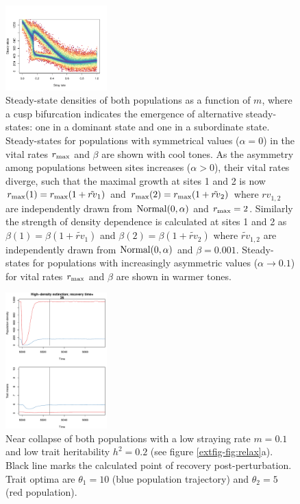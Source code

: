 \documentclass{revtex4}
\begin{document}
\begin{figure}
  \captionsetup{justification=raggedright,
singlelinecheck=false
}
\centering
\includegraphics[width=0.35\textwidth]{fig_asymdensity.pdf}
\caption{
Steady-state densities of both populations as a function of $m$, where a cusp bifurcation indicates the emergence of alternative steady-states: one in a dominant state and one in a subordinate state.
Steady-states for populations with symmetrical values ($\alpha=0$) in the vital rates $r_{\rm max}$ and $\beta$ are shown with cool tones.
As the asymmetry among populations between sites increases ($\alpha>0$), their vital rates diverge, such that the maximal growth at sites 1 and 2 is now $r_{\rm max}(1)=r_{\rm max}(1+\tilde{rv}_1)$ and $r_{\rm max}(2)=r_{\rm max}(1+\tilde{rv}_2)$ where $rv_{1,2}$ are independently drawn from $\rm{Normal}(0,\alpha)$ and $r_{\rm max}=2$. 
Similarly the strength of density dependence is calculated at sites 1 and 2 as $\beta(1)=\beta(1+\tilde{rv}_1)$ and $\beta(2)=\beta(1+\tilde{rv}_2)$ where $\tilde{rv}_{1,2}$ are independently drawn from $\rm{Normal}(0,\alpha)$ and $\beta=0.001$.
Steady-states for populations with increasingly asymmetric values ($\alpha\rightarrow 0.1$) for vital rates $r_{\rm max}$ and $\beta$ are shown in warmer tones.
} \label{fig:symmetry}
\end{figure}


\begin{figure}
  \captionsetup{justification=raggedright,
singlelinecheck=false
}
\centering
\includegraphics[width=0.35\textwidth]{fig_relax_both_lowh.pdf}
\caption{
Near collapse of both populations with a low straying rate $m=0.1$ and low trait heritability $h^2=0.2$ (see figure \ref{extfig-fig:relax}a).
Black line marks the calculated point of recovery post-perturbation.
Trait optima are $\theta_1 = 10$ (blue population trajectory) and $\theta_2 = 5$ (red population).
} \label{fig:relaxtraj_bothlh}
\end{figure}
\end{document}
